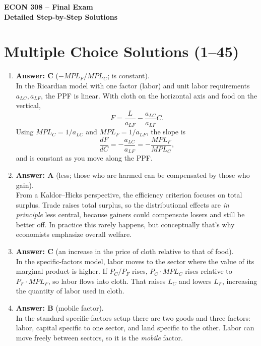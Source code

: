 \documentclass[12pt]{article}
\begin{document}
\begin{center}
\Large \textbf{ECON 308 – Final Exam\\Detailed Step-by-Step Solutions}
\end{center}

\vspace{1em}

\section*{Multiple Choice Solutions (1–45)}

\begin{enumerate}[label=\textbf{\arabic*.}]

\item \textbf{Answer: C} ($-MPL_F/MPL_C$; is constant).\\
In the Ricardian model with one factor (labor) and unit labor requirements $a_{LC},a_{LF}$, the PPF is linear. With cloth on the horizontal axis and food on the vertical,
\[
F = \frac{L}{a_{LF}} - \frac{a_{LC}}{a_{LF}} C.
\]
Using $MPL_C = 1/a_{LC}$ and $MPL_F = 1/a_{LF}$, the slope is
\[
\frac{dF}{dC} = -\frac{a_{LC}}{a_{LF}} = -\frac{MPL_F}{MPL_C},
\]
and is constant as you move along the PPF.

\item \textbf{Answer: A} (less; those who are harmed can be compensated by those who gain).\\
From a Kaldor–Hicks perspective, the efficiency criterion focuses on total surplus. Trade raises total surplus, so the distributional effects are \emph{in principle} less central, because gainers could compensate losers and still be better off. In practice this rarely happens, but conceptually that’s why economists emphasize overall welfare.

\item \textbf{Answer: C} (an increase in the price of cloth relative to that of food).\\
In the specific-factors model, labor moves to the sector where the value of its marginal product is higher. If $P_C/P_F$ rises, $P_C\cdot MPL_C$ rises relative to $P_F\cdot MPL_F$, so labor flows into cloth. That raises $L_C$ and lowers $L_F$, increasing the quantity of labor used in cloth.

\item \textbf{Answer: B} (mobile factor).\\
In the standard specific-factors setup there are two goods and three factors: labor, capital specific to one sector, and land specific to the other. Labor can move freely between sectors, so it is the \emph{mobile} factor.


\end{enumerate}
\end{document}
